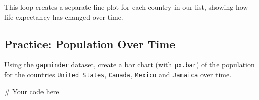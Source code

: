 \documentclass[
  letterpaper,
  DIV=11,
  numbers=noendperiod]{scrreprt}
\newenvironment{Shaded}{\begin{snugshade}}{\end{snugshade}}
\newcommand{\CommentTok}[1]{\textcolor[rgb]{0.37,0.37,0.37}{#1}}
\begin{document}
This loop creates a separate line plot for each country in our list,
showing how life expectancy has changed over time.

\begin{tcolorbox}[enhanced jigsaw, colframe=quarto-callout-tip-color-frame, opacityback=0, titlerule=0mm, bottomrule=.15mm, breakable, leftrule=.75mm, colbacktitle=quarto-callout-tip-color!10!white, title=\textcolor{quarto-callout-tip-color}{\faLightbulb}\hspace{0.5em}{Practice}, rightrule=.15mm, coltitle=black, opacitybacktitle=0.6, colback=white, left=2mm, arc=.35mm, toptitle=1mm, bottomtitle=1mm, toprule=.15mm]

\subsection{Practice: Population Over
Time}\label{practice-population-over-time}

Using the \texttt{gapminder} dataset, create a bar chart (with
\texttt{px.bar}) of the population for the countries
\texttt{United\ States}, \texttt{Canada}, \texttt{Mexico} and
\texttt{Jamaica} over time.

\begin{Shaded}
\begin{Highlighting}[]
\CommentTok{\# Your code here}
\end{Highlighting}
\end{Shaded}

\end{tcolorbox}
\end{document}
